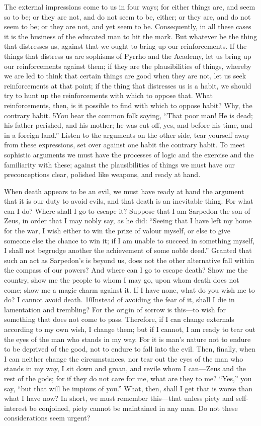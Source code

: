 The external impressions come to us in four ways; for either things are, and seem so to be; or they are not, and do not seem to be, either; or they are, and do not seem to be; or they are not, and yet seem to be. Consequently, in all these cases it is the business of the educated man to hit the mark. But whatever be the thing that distresses us, against that we ought to bring up our reinforcements. If the things that distress us are sophisms of Pyrrho and the Academy, let us bring up our reinforcements against them; if they are the plausibilities of things, whereby we are led to think that certain things are good when they are not, let us seek reinforcements at that point; if the thing that distresses us is a habit, we should try to hunt up the reinforcements with which to oppose that. What reinforcements, then, is it possible to find with which to oppose habit? Why, the contrary habit. 5You hear the common folk saying, ``That poor man! He is dead; his father perished, and his mother; he was cut off, yes, and before his time, and in a foreign land.'' Listen to the arguments on the other side, tear yourself away from these expressions, set over against one habit the contrary habit. To meet sophistic arguments we must have the processes of logic and the exercise and the familiarity with these; against the plausibilities of things we must have our preconceptions clear, polished like weapons, and ready at hand.

When death appears to be an evil, we must have ready at hand the argument that it is our duty to avoid evils, and that death is an inevitable thing. For what can I do? Where shall I go to escape it? Suppose that I am Sarpedon the son of Zeus, in order that I may nobly say, as he did: ``Seeing that I have left my home for the war, I wish either to win the prize of valour myself, or else to give someone else the chance to win it; if I am unable to succeed in something myself, I shall not begrudge another the achievement of some noble deed.'' Granted that such an act as Sarpedon's is beyond us, does not the other alternative fall within the compass of our powers? And where can I go to escape death? Show me the country, show me the people to whom I may go, upon whom death does not come; show me a magic charm against it. If I have none, what do you wish me to do? I cannot avoid death. 10Instead of avoiding the fear of it, shall I die in lamentation and trembling? For the origin of sorrow is this—to wish for something that does not come to pass. Therefore, if I can change externals according to my own wish, I change them; but if I cannot, I am ready to tear out the eyes of the man who stands in my way. For it is man's nature not to endure to be deprived of the good, not to endure to fall into the evil. Then, finally, when I can neither change the circumstances, nor tear out the eyes of the man who stands in my way, I sit down and groan, and revile whom I can—Zeus and the rest of the gods; for if they do not care for me, what are they to me? ``Yes,'' you say, ``but that will be impious of you.'' What, then, shall I get that is worse than what I have now? In short, we must remember this—that unless piety and self-interest be conjoined, piety cannot be maintained in any man. Do not these considerations seem urgent?

